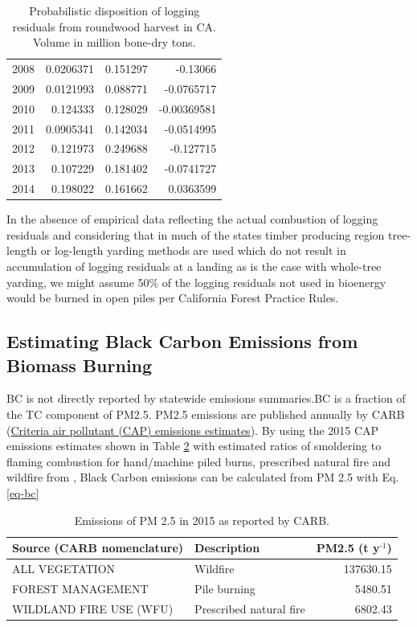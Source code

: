 \documentclass[a4paper,titlepage]{article}
\begin{document}
\begin{table}[htb]
\begin{tabular}{rrrr}
2008 & 0.0206371 & 0.151297 & -0.13066\\
2009 & 0.0121993 & 0.088771 & -0.0765717\\
2010 & 0.124333 & 0.128029 & -0.00369581\\
2011 & 0.0905341 & 0.142034 & -0.0514995\\
2012 & 0.121973 & 0.249688 & -0.127715\\
2013 & 0.107229 & 0.181402 & -0.0741727\\
2014 & 0.198022 & 0.161662 & 0.0363599\\
\end{tabular}
\caption{Probabilistic disposition of logging residuals from roundwood harvest in CA. Volume in million bone-dry tons.\label{tab:un_lr}}

\end{table}

In the absence of empirical data reflecting the actual combustion of logging residuals and considering that in much of the states timber producing region tree-length or log-length yarding methods are used which do not result in accumulation of logging residuals at a landing as is the case with whole-tree yarding, we might assume 50\% of the logging residuals not used in bioenergy would be burned in open piles per California Forest Practice Rules. 

\subsection{Estimating Black Carbon Emissions from Biomass Burning}
\label{sec:orgheadline7}

\acf{BC} is not directly reported by statewide emissions summaries.\ac{BC} is a fraction of the \ac{TC} component of \ac{PM2.5}. \ac{PM2.5} emissions are published annually by \ac{CARB} (\href{http://www.arb.ca.gov/ei/emissiondata.htm}{Criteria air pollutant (CAP) emissions estimates}). 
By using the 2015 CAP emissions estimates shown in Table \ref{tab:arb_pm_ann} with estimated ratios of 
smoldering to flaming combustion for hand/machine piled burns, prescribed 
natural fire and wildfire from \citet{Ward1989}, Black Carbon emissions
can be calculated from PM
2.5 with Eq. \eqref{eq-bc}


\begin{table}[htb]
\centering
\begin{tabular}{llr}
Source (\ac{CARB} nomenclature) & Description & \ac{PM2.5} (t y\(^{\text{-1}}\))\\
\hline
ALL VEGETATION & Wildfire & 137630.15\\
FOREST MANAGEMENT & Pile burning & 5480.51\\
WILDLAND FIRE USE (WFU) & Prescribed natural fire & 6802.43\\
\end{tabular}
\caption{Emissions of PM 2.5 in 2015 as reported by CARB. \label{tab:arb_pm_ann}}

\end{table}
\end{document}
